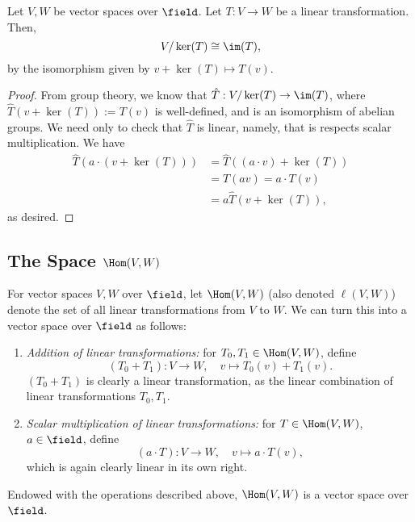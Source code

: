 \begin{theorem}
    Let $V, W$ be vector spaces over $\field$. Let $T : V \to W$ be a linear transformation. Then, \[
    V/\ker(T) \cong \im(T),\]
    by the isomorphism given by $v + \ker(T) \mapsto T(v)$.
\end{theorem}

\begin{proof}
    From group theory, we know that $\hat{T} : V/\ker(T) \to \im (T)$, where $\hat{T}(v + \ker(T)) := T(v)$ is well-defined, and is an isomorphism of abelian groups. We need only to check that $\hat{T}$ is linear, namely, that is respects scalar multiplication. We have \begin{align*}
        \hat{T}(a \cdot (v + \ker(T))) &= \hat{T}((a \cdot v) + \ker (T))\\
        &= T(av) = a \cdot T(v)\\
        &= a \hat{T}(v + \ker(T)),
    \end{align*}
    as desired.
\end{proof}

\subsection{The Space \texorpdfstring{$\Hom(V, W)$}{Hom(V, W)}}

\begin{definition}
    For vector spaces $V, W$ over $\field$, let $\Hom(V, W)$ (also denoted $\ell (V, W)$) denote the set of all linear transformations from $V$ to $W$. We can turn this into a vector space over $\field$ as follows:
    \begin{enumerate}
        \item \textit{Addition of linear transformations:} for $T_0, T_1 \in \Hom(V, W)$, define \[
            (T_0 + T_1) : V \to W, \quad v \mapsto T_0(v) + T_1(v).
        \]
        $(T_0 + T_1)$ is clearly a linear transformation, as the linear combination of linear transformations $T_0, T_1$.
        \item \textit{Scalar multiplication of linear transformations:} for $T \in \Hom(V, W)$, $a \in \field$, define \[
        (a \cdot T) : V \to W, \quad v \mapsto a \cdot T(v),    
        \]
        which is again clearly linear in its own right.
    \end{enumerate}
\end{definition}

\begin{proposition}
    Endowed with the operations described above, $\Hom(V, W)$ is a vector space over $\field$.
\end{proposition}

